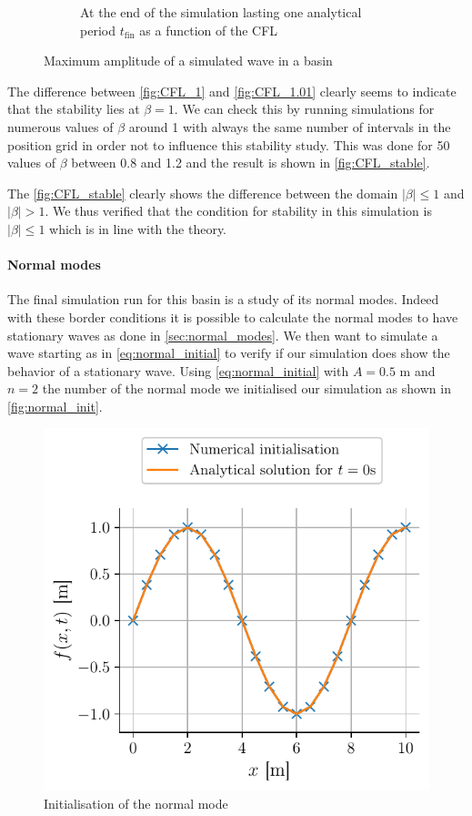 \begin{figure}
\begin{subfigure}{0.48\linewidth}
        \caption{At the end of the simulation lasting one analytical period $t_\mathrm{fin}$ as a function of the CFL}
        \label{fig:CFL_stable}
    \end{subfigure}
    \caption{Maximum amplitude of a simulated wave in a basin}
\end{figure}


The difference between \autoref{fig:CFL_1} and \autoref{fig:CFL_1.01} clearly seems to indicate that the stability lies at $\beta = 1$. We can check this by running simulations for numerous values of $\beta$ around 1 with always the same number of intervals in the position grid in order not to influence this stability study. This was done for 50 values of $\beta$ between 0.8 and 1.2 and the result is shown in \autoref{fig:CFL_stable}.

The \autoref{fig:CFL_stable} clearly shows the difference between the domain $|\beta| \leq 1$ and $|\beta| > 1$. We thus verified that the condition for stability in this simulation is $|\beta| \leq 1$ which is in line with the theory.


\paragraph{Normal modes} The final simulation run for this basin is a study of its normal modes. Indeed with these border conditions it is possible to calculate the normal modes to have stationary waves as done in \autoref{sec:normal_modes}. We then want to simulate a wave starting as in \autoref{eq:normal_initial} to verify if our simulation does show the behavior of a stationary wave. Using \autoref{eq:normal_initial} with $A = 0.5$ \si{\meter} and $n = 2$ the number of the normal mode we initialised our simulation as shown in \autoref{fig:normal_init}.
\begin{figure}[h]
    \centering
    \includegraphics*[width=0.6\linewidth]{figures/bassin_mode_start.pdf}
    \caption{Initialisation of the normal mode}
    \label{fig:normal_init}
\end{figure}

